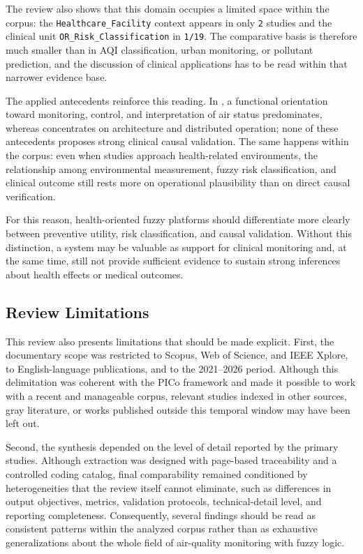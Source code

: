 The review also shows that this domain occupies a limited space within the corpus: the \texttt{Healthcare\_Facility} context appears in only \texttt{2} studies and the clinical unit \texttt{OR\_Risk\_Classification} in \texttt{1/19}. The comparative basis is therefore much smaller than in AQI classification, urban monitoring, or pollutant prediction, and the discussion of clinical applications has to be read within that narrower evidence base.

The applied antecedents reinforce this reading. In \cite{ART05,ART06,ART07}, a functional orientation toward monitoring, control, and interpretation of air status predominates, whereas \cite{ART08} concentrates on architecture and distributed operation; none of these antecedents proposes strong clinical causal validation. The same happens within the corpus: even when studies approach health-related environments, the relationship among environmental measurement, fuzzy risk classification, and clinical outcome still rests more on operational plausibility than on direct causal verification.

For this reason, health-oriented fuzzy platforms should differentiate more clearly between preventive utility, risk classification, and causal validation. Without this distinction, a system may be valuable as support for clinical monitoring and, at the same time, still not provide sufficient evidence to sustain strong inferences about health effects or medical outcomes.

\subsection{Review Limitations}
This review also presents limitations that should be made explicit. First, the documentary scope was restricted to Scopus, Web of Science, and IEEE Xplore, to English-language publications, and to the 2021--2026 period. Although this delimitation was coherent with the PICo framework and made it possible to work with a recent and manageable corpus, relevant studies indexed in other sources, gray literature, or works published outside this temporal window may have been left out.

Second, the synthesis depended on the level of detail reported by the primary studies. Although extraction was designed with page-based traceability and a controlled coding catalog, final comparability remained conditioned by heterogeneities that the review itself cannot eliminate, such as differences in output objectives, metrics, validation protocols, technical-detail level, and reporting completeness. Consequently, several findings should be read as consistent patterns within the analyzed corpus rather than as exhaustive generalizations about the whole field of air-quality monitoring with fuzzy logic.

